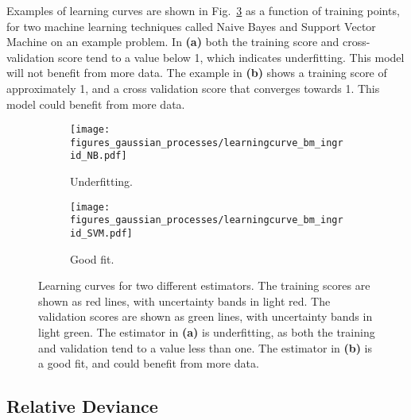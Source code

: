\documentclass[twoside,english]{uiofysmaster}
\begin{document}
{Examples of learning curves are shown in Fig.~\ref{Fig:: gaussian process : learning curves} as a function of training points, for two machine learning techniques called Naive Bayes and Support Vector Machine on an example problem. In \textbf{(a)} both the training score and cross-validation score tend to a value below 1, which indicates underfitting. This model will not benefit from more data. The example in \textbf{(b)} shows a training score of approximately 1, and a cross validation score that converges towards 1. This model could benefit from more data.

\begin{figure}
    \centering
    \begin{subfigure}[b]{0.45\textwidth}
        \texttt{[image: figures\_gaussian\_processes/learningcurve\_bm\_ingrid\_NB.pdf]}
        \caption{Underfitting.}
        \label{fig:gull}
    \end{subfigure}
    \begin{subfigure}[b]{0.45\textwidth}
        \texttt{[image: figures\_gaussian\_processes/learningcurve\_bm\_ingrid\_SVM.pdf]}
        \caption{Good fit.}
        \label{fig:tiger}
    \end{subfigure}
\caption{Learning curves for two different estimators. The training scores are shown as red lines, with uncertainty bands in light red. The validation scores are shown as green lines, with uncertainty bands in light green. The estimator in \textbf{(a)} is underfitting, as both the training and validation tend to a value less than one. The estimator in \textbf{(b)} is a good fit, and could benefit from more data.}
\label{Fig:: gaussian process : learning curves}
\end{figure}



\subsection{Relative Deviance}\label{Sec:: gaussian process : Relative Deviance}

}
\end{document}

